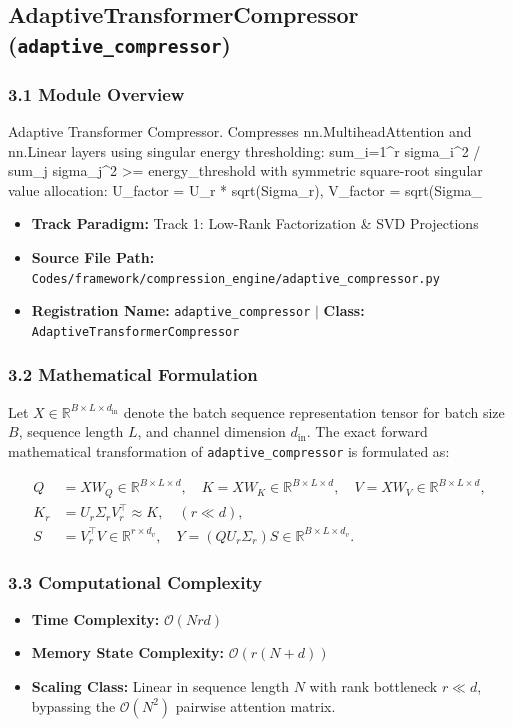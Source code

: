 \subsection{AdaptiveTransformerCompressor (\texttt{adaptive\_compressor})}
\label{sec:app_module_adaptive\_compressor}

\subsubsection*{3.1 Module Overview}
Adaptive Transformer Compressor.  Compresses nn.MultiheadAttention and nn.Linear layers using singular energy thresholding:     sum\_{i=1}^r sigma\_i^2 / sum\_j sigma\_j^2 >= energy\_threshold with symmetric square-root singular value allocation:     U\_factor = U\_r * sqrt(Sigma\_r), V\_factor = sqrt(Sigma\_
\begin{itemize}
    \item \textbf{Track Paradigm:} Track 1: Low-Rank Factorization & SVD Projections
    \item \textbf{Source File Path:} \texttt{Codes/framework/compression\_engine/adaptive\_compressor.py}
    \item \textbf{Registration Name:} \texttt{adaptive\_compressor} $\mid$ \textbf{Class:} \texttt{AdaptiveTransformerCompressor}
\end{itemize}

\subsubsection*{3.2 Mathematical Formulation}
Let $X \in \mathbb{R}^{B \times L \times d_{\text{in}}}$ denote the batch sequence representation tensor for batch size $B$, sequence length $L$, and channel dimension $d_{\text{in}}$. The exact forward mathematical transformation of \texttt{adaptive\_compressor} is formulated as:

\begin{align}
Q &= X W_Q \in \mathbb{R}^{B \times L \times d}, \quad K = X W_K \in \mathbb{R}^{B \times L \times d}, \quad V = X W_V \in \mathbb{R}^{B \times L \times d}, \\
K_r &= U_r \Sigma_r V_r^\top \approx K, \quad (r \ll d), \\
S &= V_r^\top V \in \mathbb{R}^{r \times d_v}, \quad Y = (Q U_r \Sigma_r) S \in \mathbb{R}^{B \times L \times d_v}.
\end{align}


\subsubsection*{3.3 Computational Complexity}
\begin{itemize}
    \item \textbf{Time Complexity:} $\mathcal{O}(N r d)$
    \item \textbf{Memory State Complexity:} $\mathcal{O}(r(N + d))$
    \item \textbf{Scaling Class:} Linear in sequence length $N$ with rank bottleneck $r \ll d$, bypassing the $\mathcal{O}(N^2)$ pairwise attention matrix.
\end{itemize}

